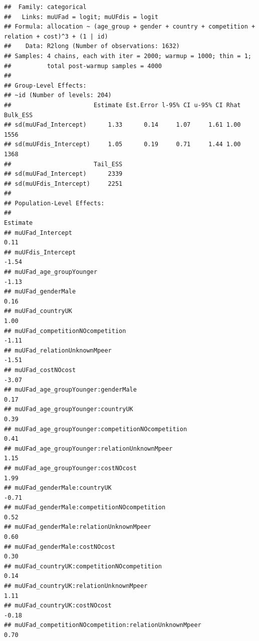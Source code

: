 \documentclass[
]{article}
\begin{document}
\begin{verbatim}
##  Family: categorical 
##   Links: muUFad = logit; muUFdis = logit 
## Formula: allocation ~ (age_group + gender + country + competition + relation + cost)^3 + (1 | id) 
##    Data: R2long (Number of observations: 1632) 
## Samples: 4 chains, each with iter = 2000; warmup = 1000; thin = 1;
##          total post-warmup samples = 4000
## 
## Group-Level Effects: 
## ~id (Number of levels: 204) 
##                       Estimate Est.Error l-95% CI u-95% CI Rhat Bulk_ESS
## sd(muUFad_Intercept)      1.33      0.14     1.07     1.61 1.00     1556
## sd(muUFdis_Intercept)     1.05      0.19     0.71     1.44 1.00     1368
##                       Tail_ESS
## sd(muUFad_Intercept)      2339
## sd(muUFdis_Intercept)     2251
## 
## Population-Level Effects: 
##                                                                        Estimate
## muUFad_Intercept                                                           0.11
## muUFdis_Intercept                                                         -1.54
## muUFad_age_groupYounger                                                   -1.13
## muUFad_genderMale                                                          0.16
## muUFad_countryUK                                                           1.00
## muUFad_competitionNOcompetition                                           -1.11
## muUFad_relationUnknownMpeer                                               -1.51
## muUFad_costNOcost                                                         -3.07
## muUFad_age_groupYounger:genderMale                                         0.17
## muUFad_age_groupYounger:countryUK                                          0.39
## muUFad_age_groupYounger:competitionNOcompetition                           0.41
## muUFad_age_groupYounger:relationUnknownMpeer                               1.15
## muUFad_age_groupYounger:costNOcost                                         1.99
## muUFad_genderMale:countryUK                                               -0.71
## muUFad_genderMale:competitionNOcompetition                                 0.52
## muUFad_genderMale:relationUnknownMpeer                                     0.60
## muUFad_genderMale:costNOcost                                               0.30
## muUFad_countryUK:competitionNOcompetition                                  0.14
## muUFad_countryUK:relationUnknownMpeer                                      1.11
## muUFad_countryUK:costNOcost                                               -0.18
## muUFad_competitionNOcompetition:relationUnknownMpeer                       0.70

\end{verbatim}
\end{document}
